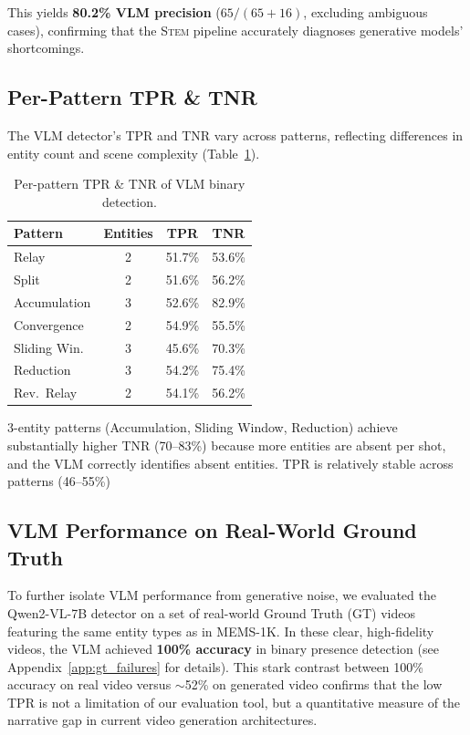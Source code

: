 \documentclass[sigconf,review,anonymous]{acmart}
\newcommand{\stem}{\textsc{Stem}}
\begin{document}
\noindent This yields \textbf{80.2\% VLM precision} ($65/(65{+}16)$, excluding ambiguous cases), confirming that the \stem{} pipeline accurately diagnoses generative models' shortcomings.

\subsection{Per-Pattern TPR \& TNR}

The VLM detector's TPR and TNR vary across patterns, reflecting differences in entity count and scene complexity (Table~\ref{tab:vlm_quality}).
\begin{table}[H]
\caption{Per-pattern TPR \& TNR of VLM binary detection.}
\label{tab:vlm_quality}
\centering
\small
\begin{tabular}{@{}lccc@{}}
\toprule
Pattern & Entities & TPR & TNR \\
\midrule
Relay         & 2 & 51.7\% & 53.6\% \\
Split         & 2 & 51.6\% & 56.2\% \\
Accumulation  & 3 & 52.6\% & 82.9\% \\
Convergence   & 2 & 54.9\% & 55.5\% \\
Sliding Win.  & 3 & 45.6\% & 70.3\% \\
Reduction     & 3 & 54.2\% & 75.4\% \\
Rev.\ Relay   & 2 & 54.1\% & 56.2\% \\
\bottomrule
\end{tabular}
\end{table}

3-entity patterns (Accumulation, Sliding Window, Reduction) achieve substantially higher TNR (70--83\%) because more entities are absent per shot, and the VLM correctly identifies absent entities.
TPR is relatively stable across patterns (46--55\%)

\subsection{VLM Performance on Real-World Ground Truth}

To further isolate VLM performance from generative noise, we evaluated the Qwen2-VL-7B detector on a set of real-world Ground Truth (GT) videos featuring the same entity types as in MEMS-1K. In these clear, high-fidelity videos, the VLM achieved \textbf{100\% accuracy} in binary presence detection (see Appendix~\ref{app:gt_failures} for details). This stark contrast between 100\% accuracy on real video versus $\sim$52\% on generated video confirms that the low TPR is not a limitation of our evaluation tool, but a quantitative measure of the narrative gap in current video generation architectures.
\end{document}
